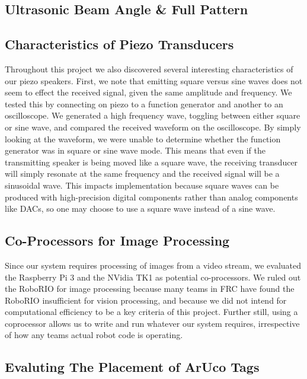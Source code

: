 \documentclass{article}
\begin{document}
  \subsection{Ultrasonic Beam Angle \& Full Pattern}


  \subsection{Characteristics of Piezo Transducers}

    Throughout this project we also discovered several interesting characteristics of our piezo speakers. First, we note that emitting square versus sine waves does not seem to effect the received signal, given the same amplitude and frequency. We tested this by connecting on piezo to a function generator and another to an oscilloscope. We generated a high frequency wave, toggling between either square or sine wave, and compared the received waveform on the oscilloscope. By simply looking at the waveform, we were unable to determine whether the function generator was in square or sine wave mode. This means that even if the transmitting speaker is being moved like a square wave, the receiving transducer will simply resonate at the same frequency and the received signal will be a sinusoidal wave. This impacts implementation because square waves can be produced with high-precision digital components rather than analog components like DACs, so one may choose to use a square wave instead of a sine wave.

	\subsection{Co-Processors for Image Processing}

    Since our system requires processing of images from a video stream, we evaluated the Raspberry Pi 3 and the NVidia TK1 as potential co-processors. We ruled out the RoboRIO for image processing because many teams in FRC have found the RoboRIO insufficient for vision processing, and because we did not intend for computational efficiency to be a key criteria of this project. Further still, using a coprocessor allows us to write and run whatever our system requires, irrespective of how any teams actual robot code is operating.


  \subsection{Evaluting The Placement of ArUco Tags} \label{section:tag_placement}
\end{document}
